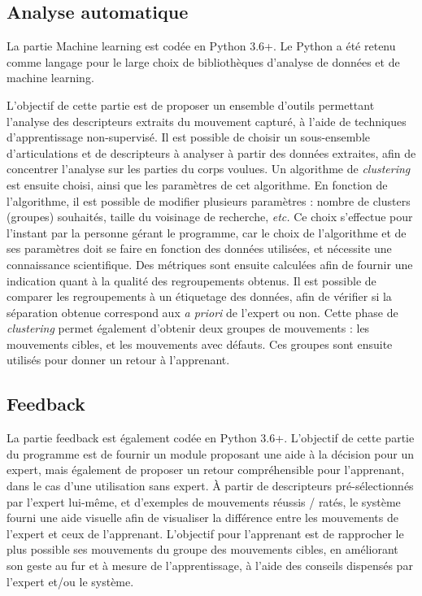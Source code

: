 \subsection{Analyse automatique}
La partie Machine learning est codée en Python 3.6+. Le Python a été retenu comme langage pour le large choix de bibliothèques d'analyse de données et de machine learning.

L'objectif de cette partie est de proposer un ensemble d'outils permettant l'analyse des descripteurs extraits du mouvement capturé, à l'aide de techniques d'apprentissage non-supervisé. Il est possible de choisir un sous-ensemble d'articulations et de descripteurs à analyser à partir des données extraites, afin de concentrer l'analyse sur les parties du corps voulues. Un algorithme de \textit{clustering} est ensuite choisi, ainsi que les paramètres de cet algorithme. En fonction de l'algorithme, il est possible de modifier plusieurs paramètres : nombre de clusters (groupes) souhaités, taille du voisinage de recherche, \textit{etc.} Ce choix s'effectue pour l'instant par la personne gérant le programme, car le choix de l'algorithme et de ses paramètres doit se faire en fonction des données utilisées, et nécessite une connaissance scientifique. Des métriques sont ensuite calculées afin de fournir une indication quant à la qualité des regroupements obtenus. Il est possible de comparer les regroupements à un étiquetage des données, afin de vérifier si la séparation obtenue correspond aux \textit{a priori} de l'expert ou non. Cette phase de \textit{clustering} permet également d'obtenir deux groupes de mouvements : les mouvements cibles, et les mouvements avec défauts. Ces groupes sont ensuite utilisés pour donner un retour à l'apprenant.

\subsection{Feedback}
La partie feedback est également codée en Python 3.6+. L'objectif de cette partie du programme est de fournir un module proposant une aide à la décision pour un expert, mais également de proposer un retour compréhensible pour l'apprenant, dans le cas d'une utilisation sans expert. À partir de descripteurs pré-sélectionnés par l'expert lui-même, et d'exemples de mouvements réussis / ratés, le système fourni une aide visuelle afin de visualiser la différence entre les mouvements de l'expert et ceux de l'apprenant. L'objectif pour l'apprenant est de rapprocher le plus possible ses mouvements du groupe des mouvements cibles, en améliorant son geste au fur et à mesure de l'apprentissage, à l'aide des conseils dispensés par l'expert et/ou le système.\\


